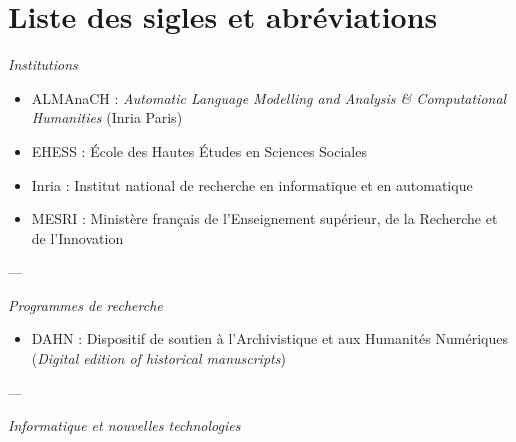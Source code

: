 \chapter*{Liste des sigles et abréviations}

\begin{center}
\textit{Institutions}
\end{center} 

\begin{itemize}
    \item ALMAnaCH : \textit{Automatic Language Modelling and Analysis \& Computational Humanities} (Inria Paris)
    \item EHESS : École des Hautes Études en Sciences Sociales
    \item Inria : Institut national de recherche en informatique et en automatique
    \item MESRI : Ministère français de l’Enseignement supérieur, de la Recherche et de l’Innovation
\end{itemize}

\bigbreak

\begin{center}---

\bigbreak

\textit{Programmes de recherche}
\end{center} 

\begin{itemize}
    \item DAHN : Dispositif de soutien à l’Archivistique et aux Humanités Numériques (\textit{Digital edition of historical manuscripts})
\end{itemize}

\begin{center}---

\bigbreak

\textit{Informatique et nouvelles technologies}
\end{center} 

\bigbreak

